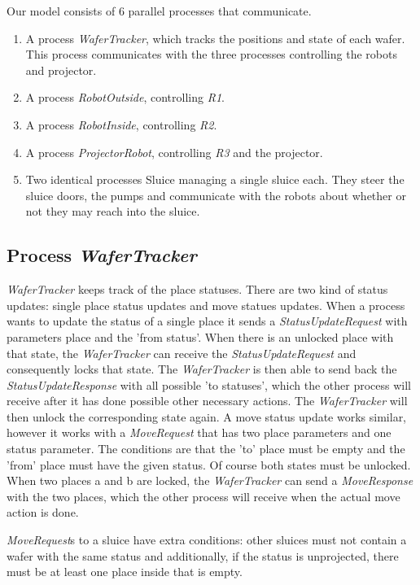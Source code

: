 \cbstart
Our model consists of 6 parallel processes that communicate.
\begin{enumerate}
 \item A process \emph{WaferTracker}, which tracks the positions and state of each wafer. This process communicates with the three processes controlling the robots and projector.
 \item A process \emph{RobotOutside}, controlling \emph{R1}.
 \item A process \emph{RobotInside}, controlling \emph{R2}.
 \item A process \emph{ProjectorRobot}, controlling \emph{R3} and the projector.
 \item Two identical processes Sluice managing a single sluice each. They steer the sluice doors, the pumps and communicate with the robots about whether or not they may reach into the sluice.
\end{enumerate}

\subsection{Process \emph{WaferTracker}}

\emph{WaferTracker} keeps track of the place statuses. There are two kind of status
updates: single place status updates and move statues updates. When a
process wants to update the status of a single place it sends a
\emph{StatusUpdateRequest} with parameters place and the 'from status'. When there
is an unlocked place with that state, the \emph{WaferTracker} can receive the
\emph{StatusUpdateRequest} and consequently locks that state. The \emph{WaferTracker} is
then able to send back the \emph{StatusUpdateResponse} with all possible 'to
statuses', which the other process will receive after it has done possible
other necessary actions. The \emph{WaferTracker} will then unlock the corresponding
state again. A move status update works similar, however it works with a
\emph{MoveRequest} that has two place parameters and one status parameter. The
conditions are that the 'to' place must be empty and the 'from' place must
have the given status. Of course both states must be unlocked. When two
places a and b are locked, the \emph{WaferTracker} can send a \emph{MoveResponse} with
the two places, which the other process will receive when the actual move
action is done.

\emph{MoveRequest}s to a sluice have extra conditions: other sluices must not
contain a wafer with the same status and additionally, if the status is
unprojected, there must be at least one place inside that is empty.

